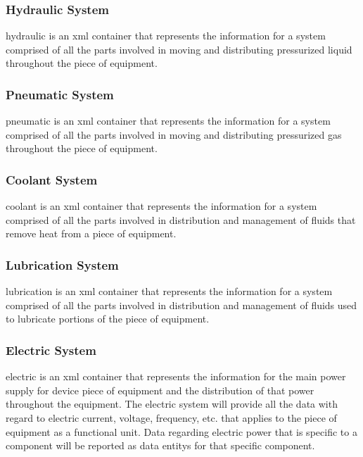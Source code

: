 \subsubsection{Hydraulic System}

\gls{hydraulic} is an \gls{xml} container that represents the information for a system comprised of all the parts involved in moving and distributing pressurized liquid throughout the piece of equipment.

\subsubsection{Pneumatic System}

\gls{pneumatic} is an \gls{xml} container that represents the information for a system comprised of all the parts involved in moving and distributing pressurized gas throughout the piece of equipment. 

\subsubsection{Coolant System}

\gls{coolant} is an \gls{xml} container that represents the information for a system comprised of all the parts involved in distribution and management of fluids that remove heat from a piece of equipment.

\subsubsection{Lubrication System}

\gls{lubrication} is an \gls{xml} container that represents the information for a system comprised of all the parts involved in distribution and management of fluids used to lubricate portions of the piece of equipment.

\subsubsection{Electric System}

\gls{electric} is an \gls{xml} container that represents the information for the main power supply for device piece of equipment and the distribution of that power throughout the equipment.  The electric system will provide all the data with regard to electric current, voltage, frequency, etc. that applies to the piece of equipment as a functional unit.   Data regarding electric power that is specific to a \gls{component} will be reported as \glspl{data entity} for that specific \gls{component}.

